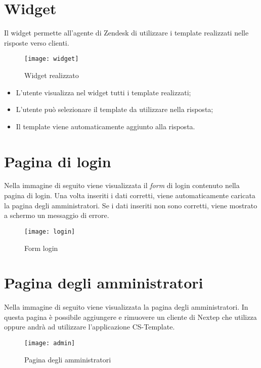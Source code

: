 \section{Widget} 
Il widget permette all'agente di Zendesk di utilizzare i template realizzati nelle risposte verso clienti. 
  \begin{figure}[!h] 
  	\centering 
  	\texttt{[image: widget]} 
  	\caption{Widget realizzato }
  \end{figure}
  \begin{itemize}
  	\item L'utente visualizza nel widget tutti i template realizzati;
  	\item L'utente può selezionare il template da utilizzare nella risposta;
  	\item Il template viene automaticamente aggiunto alla risposta. 
  \end{itemize}
\newpage
\section{Pagina di login}
Nella immagine di seguito viene visualizzata il \emph{form} di login contenuto nella pagina di login. Una volta inseriti i dati corretti, viene automaticamente caricata la pagina degli amministratori. Se i dati inseriti non sono corretti, viene mostrato a schermo un messaggio di errore.
\begin{figure}[!h] 
	\centering 
	\texttt{[image: login]} 
	\caption{Form login }
\end{figure}
\section{Pagina degli amministratori}
Nella immagine di seguito viene visualizzata la pagina degli amministratori. In questa pagina è possibile aggiungere e rimuovere un cliente di Nextep che utilizza oppure andrà ad utilizzare l'applicazione CS-Template.
\begin{figure}[!h] 
	\centering 
	\texttt{[image: admin]} 
	\caption{Pagina degli amministratori }
\end{figure}

